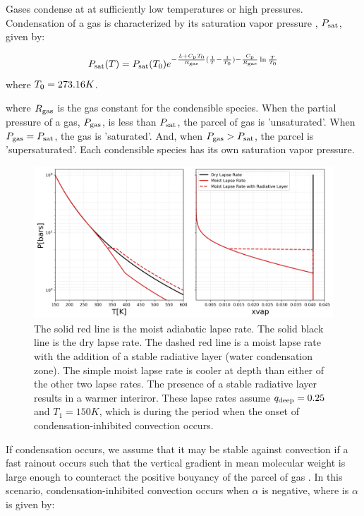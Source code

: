\documentclass[11pt]{ucscthesisbs}
\begin{document}
Gases condense at at sufficiently low temperatures or high pressures. Condensation of a gas is characterized by its saturation vapor pressure \citep{sanchez_2011}, $P_{\rm sat}$, given by: 

\begin{equation}
  P_{\rm sat}(T) = P_{\rm sat}(T_{\rm 0})e^{-\frac{L + C_{\rm p}T_{\rm 0}}{R_{\rm gas}}(\frac{1}{T} - \frac{1}{T_{\rm 0}}) -\frac{C_{\rm p}}{R_{\rm gas}}\ln{\frac{T}{T_{\rm 0}}}}
\end{equation}
where $T_{\rm 0} = 273.16K$.

where $R_{\rm gas}$ is the gas constant for the condensible species. When the partial pressure of a gas, $P_{\rm gas}$, is less than $P_{\rm sat}$, the parcel of gas is 'unsaturated'. When $P_{\rm gas} = P_{\rm sat}$, the gas is 'saturated'. And, when $P_{\rm gas} > P_{\rm sat}$, the parcel is 'supersaturated'. Each condensible species has its own saturation vapor pressure. 

\begin{figure}[ht!]
 \centerline{
  \includegraphics[width=6.5in]{figures/comparison_dry_vs_moist_lapse_rates.png}
 }
\caption[A Standard Interior Structure Model]
{The solid red line is the moist adiabatic lapse rate. The solid black line is the dry lapse rate. The dashed red line is a moist lapse rate with the addition of a stable radiative layer (water condensation zone). The simple moist lapse rate is cooler at depth than either of the other two lapse rates. The presence of a stable radiative layer results in a warmer interiror. These lapse rates assume $q_{\rm deep} = 0.25$ and $T_{1} = 150K$, which is during the period when the onset of condensation-inhibited convection occurs.}
\label{fig:standard_dry_interior}
\end{figure}


If condensation occurs, we assume that it may be stable against convection if a fast rainout occurs such that the vertical gradient in mean molecular weight is large enough to counteract the positive bouyancy of the parcel of gas \citep{leconte_2017} \citep{friedson_2017}. In this scenario, condensation-inhibited convection occurs when $\alpha$ is negative, where is $\alpha$ \citep{friedson_2017} is given by:
\end{document}
